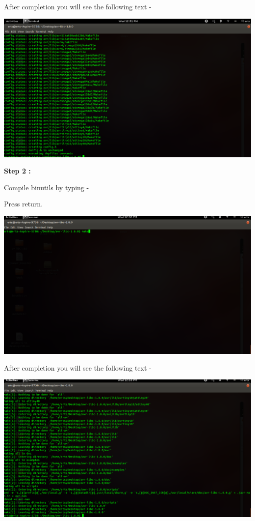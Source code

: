 \begin{flushleft}
\medskip

After completion you will see the following text - 

\medskip

\includegraphics[scale=0.3]{f13}

\medskip

\textbf{Step 2 :}

\medskip

Compile binutils by typing - 
\medskip

\medskip

Press return.

\medskip

\includegraphics[scale=0.3]{f14}


\medskip

After completion you will see the following text - 

\medskip

\includegraphics[scale=0.3]{f15}


\end{flushleft}
